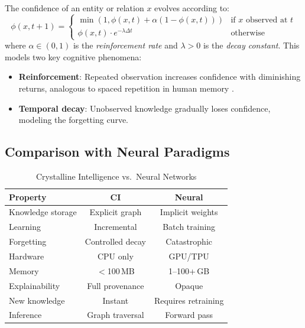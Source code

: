 \documentclass[11pt,twocolumn]{article}
\begin{document}
The confidence of an entity or relation $x$ evolves according to:
\begin{equation}
  \phi(x, t+1) = \begin{cases}
    \min(1, \phi(x,t) + \alpha(1-\phi(x,t))) & \text{if } x \text{ observed at } t \\
    \phi(x,t) \cdot e^{-\lambda \Delta t} & \text{otherwise}
  \end{cases}
  \label{eq:confidence}
\end{equation}
where $\alpha \in (0,1)$ is the \emph{reinforcement rate} and $\lambda > 0$ is the \emph{decay constant}. This models two key cognitive phenomena:
\begin{itemize}
  \item \textbf{Reinforcement}: Repeated observation increases confidence with diminishing returns, analogous to spaced repetition in human memory \citep{ebbinghaus1885memory}.
  \item \textbf{Temporal decay}: Unobserved knowledge gradually loses confidence, modeling the forgetting curve.
\end{itemize}

\subsection{Comparison with Neural Paradigms}

\begin{table}[h]
\centering
\caption{Crystalline Intelligence vs.\ Neural Networks}
\label{tab:comparison}
\small
\begin{tabular}{@{}lcc@{}}
\toprule
\textbf{Property} & \textbf{CI} & \textbf{Neural} \\
\midrule
Knowledge storage & Explicit graph & Implicit weights \\
Learning & Incremental & Batch training \\
Forgetting & Controlled decay & Catastrophic \\
Hardware & CPU only & GPU/TPU \\
Memory & $<$100\,MB & 1--100+\,GB \\
Explainability & Full provenance & Opaque \\
New knowledge & Instant & Requires retraining \\
Inference & Graph traversal & Forward pass \\
\bottomrule
\end{tabular}
\end{table}

\end{document}

